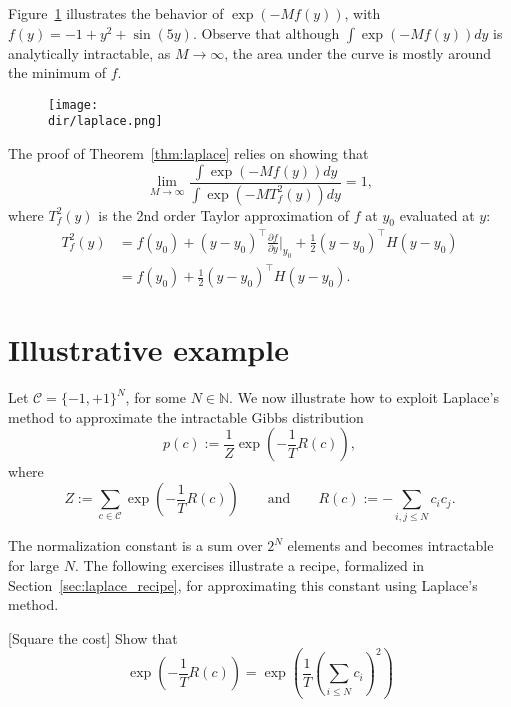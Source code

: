 Figure~\ref{fig:laplace} illustrates the behavior of $\exp\left(-M f(y)\right)$, with $f(y) = -1 + y^2 + \sin(5y)$. Observe that although $\int \exp\left(-M f(y)\right) dy$ is analytically intractable, as $M \to \infty$, the area under the curve is mostly around the minimum of $f$.

\begin{figure}[hbtp]
\centering
\texttt{[image: \\dir/laplace.png]}
\caption{}
\label{fig:laplace}
\end{figure}

The proof of Theorem~\ref{thm:laplace} relies on showing that
%
\begin{equation}
\lim_{M \to \infty} \frac{\displaystyle \int \exp\left(-M f(y)\right) dy}{\displaystyle \int \exp\left(-M T^2_f(y)\right) dy}=1,
\end{equation}
%
where $T^2_f(y)$ is the 2nd order Taylor approximation of $f$ at $y_0$ evaluated at $y$:
%
\begin{align}
T^2_f(y) &= f(y_0) + (y - y_0)^\top \frac{\partial f}{\partial y}\Bigr|_{y_0} + \frac{1}{2}(y - y_0)^\top H (y - y_0)\\
&= f(y_0) + \frac{1}{2}(y - y_0)^\top H (y - y_0).
\end{align}
%

\section{Illustrative example}

Let $\mathcal{C} = \{-1, +1\}^N$, for some $N \in \mathbb{N}$. We now illustrate how to exploit Laplace's method to approximate the intractable Gibbs distribution
%
\begin{equation}
p(c) := \frac{1}{Z}\exp\left(-\frac{1}{T}R(c)\right),
\end{equation}
%
where
%
\begin{equation}
Z := \sum_{c \in \mathcal{C}} \exp\left(-\frac{1}{T}R(c)\right) \qquad \text{and} \qquad R(c) := - \sum_{i, j \leq N}c_ic_j.
\end{equation}

The normalization constant is a sum over $2^N$ elements and becomes intractable for large $N$. The following exercises illustrate a recipe, formalized in Section~\ref{sec:laplace_recipe}, for approximating this constant using Laplace's method.

\begin{exercise}{[Square the cost]}
Show that
%
\begin{equation}
\exp\left(-\frac{1}{T}R(c)\right) = \exp\left(\frac{1}{T}\left(\sum_{i \leq N}c_i\right)^2\right)
\end{equation}
%
\end{exercise}

